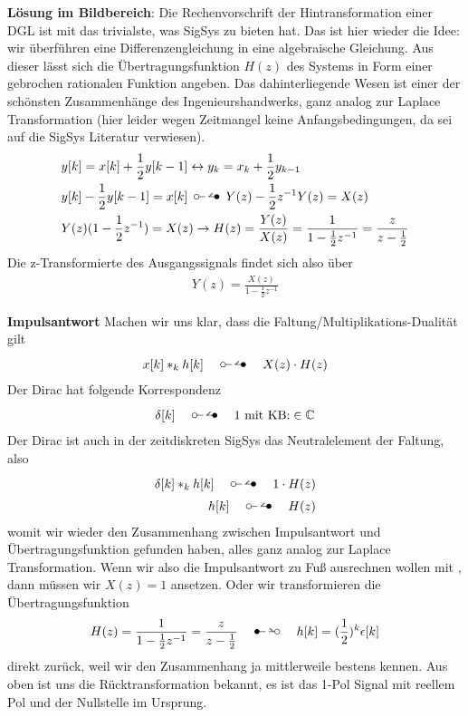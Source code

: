 \begin{ExCalc}
\textbf{Lösung im Bildbereich}:
Die Rechenvorschrift der Hintransformation
einer DGL ist mit das trivialste, was SigSys zu bieten hat. Das ist hier wieder
die Idee: wir überführen eine Differenzengleichung in eine algebraische Gleichung.
Aus dieser lässt sich die Übertragungsfunktion $H(z)$ des Systems in Form einer
gebrochen rationalen Funktion angeben. Das dahinterliegende Wesen ist einer der
schönsten Zusammenhänge des Ingenieurshandwerks, ganz analog zur Laplace
Transformation (hier leider wegen Zeitmangel keine Anfangsbedingungen,
da sei auf die SigSys Literatur verwiesen).
\begin{align}
&y[k] = x[k] + \frac{1}{2} y[k-1] \leftrightarrow y_k = x_k + \frac{1}{2} y_{k-1}\\
&y[k] - \frac{1}{2} y[k-1] = x[k] \,\ztransf\, Y(z) - \frac{1}{2} z^{-1} Y(z) = X(z)\\
&Y(z) (1-\frac{1}{2} z^{-1}) = X(z) \rightarrow H(z) = \frac{Y(z)}{X(z)} =
\frac{1}{1-\frac{1}{2} z^{-1}} = \frac{z}{z-\frac{1}{2}}
\end{align}
Die z-Transformierte des Ausgangssignals findet sich also über
\begin{align}
\label{eq:Y_HX_zTrafo_A1D74A9E5B}
Y(z) = \frac{X(z)}{1-\frac{1}{2} z^{-1}}
\end{align}

\textbf{Impulsantwort}
Machen wir uns klar, dass die Faltung/Multiplikations-Dualität gilt
\begin{align}
x[k] \ast_k h[k] \quad\ztransf\quad X(z) \cdot H(z)
\end{align}
Der Dirac hat folgende Korrespondenz
\begin{align}
\delta[k] \quad\ztransf\quad 1\text{ mit KB:} \in\mathbb{C}
\end{align}
Der Dirac ist auch in der zeitdiskreten SigSys das Neutralelement der Faltung,
also
\begin{align}
\delta[k] \ast_k h[k] \quad\ztransf\quad 1 \cdot H(z)\\
h[k] \quad\ztransf\quad H(z)
\end{align}
womit wir wieder den Zusammenhang zwischen Impulsantwort und Übertragungsfunktion
gefunden haben, alles ganz analog zur Laplace Transformation.
%
Wenn wir also die Impulsantwort zu Fuß ausrechnen wollen
mit , dann müssen wir $X(z)=1$ ansetzen.
%
Oder wir transformieren die Übertragungsfunktion
\begin{align}
H(z) = \frac{1}{1-\frac{1}{2} z^{-1}} = \frac{z}{z-\frac{1}{2}}
\quad\Ztransf\quad
h[k] = (\frac{1}{2})^k \epsilon[k]
\end{align}
direkt zurück, weil wir den Zusammenhang ja mittlerweile bestens kennen.
Aus  oben ist uns die Rücktransformation
bekannt, es ist das 1-Pol Signal mit reellem Pol und
der Nullstelle im Ursprung.


\end{ExCalc}
